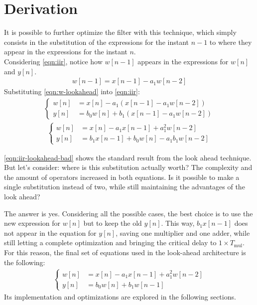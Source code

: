 \section{Derivation}
It is possible to further optimize the filter with this technique, which simply consists in the substitution of the expressions for the instant $n-1$ to where they appear in the expressions for the instant $n$.\\
Considering \autoref{eqn:iir}, notice how $w[n-1]$ appears in the expressions for $w[n]$ and $y[n]$.
\begin{align}
	w[n-1] = x[n-1] - a_1 w[n-2]
	\label{eqn:w-lookahead}
\end{align}
Substituting \autoref{eqn:w-lookahead} into \autoref{eqn:iir}:
\begin{align*}
	\begin{cases}
		w[n] &= x[n] - a_1 (x[n-1] - a_1 w[n-2]) 		\\
		y[n] &= b_0 w[n] + b_1 (x[n-1] - a_1 w[n-2])
	\end{cases}
\end{align*}
\begin{align}
	\begin{cases}
		w[n] &= x[n] - a_1 x[n-1] + a_1^2 w[n-2] 		\\
		y[n] &= b_1 x[n-1] + b_0 w[n] - a_1 b_1 w[n-2]
	\end{cases}
	\label{eqn:iir-lookahead-bad}
\end{align}

\autoref{eqn:iir-lookahead-bad} shows the standard result from the look ahead technique. But let's consider: where is this substitution actually worth? The complexity and the amount of operators increased in both equations. Is it possible to make a single substitution instead of two, while still maintaining the advantages of the look ahead?

The answer is yes. Considering all the possible cases, the best choice is to use the new expression for $w[n]$ but to keep the old $y[n]$. This way, $b_1 x[n-1]$ does not appear in the equation for $y[n]$, saving one multiplier and one adder, while still letting a complete optimization and bringing the critical delay to $1 \times T_\text{mul}$.\\
For this reason, the final set of equations used in the look-ahead architecture is the following:
\begin{align}
	\begin{cases}
		w[n] &= x[n] - a_1 x[n-1] + a_1^2 w[n-2] 		\\
		y[n] &= b_0 w[n] + b_1 w[n-1]
	\end{cases}
	\label{eqn:iir-lookahead}
\end{align}
Its implementation and optimizations are explored in the following sections.
